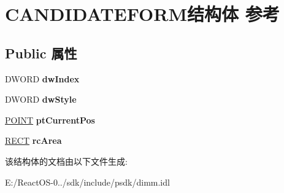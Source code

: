 \hypertarget{struct_c_a_n_d_i_d_a_t_e_f_o_r_m}{}\section{C\+A\+N\+D\+I\+D\+A\+T\+E\+F\+O\+R\+M结构体 参考}
\label{struct_c_a_n_d_i_d_a_t_e_f_o_r_m}
\subsection*{Public 属性}
\begin{DoxyCompactItemize}
\item 
\mbox{\label{struct_c_a_n_d_i_d_a_t_e_f_o_r_m_a150611c94ff5afa1f2fc01c66a6835c1}} 
D\+W\+O\+RD {\bfseries dw\+Index}
\item 
\mbox{\label{struct_c_a_n_d_i_d_a_t_e_f_o_r_m_a500b6deec849300d1800c12c7132fe8d}} 
D\+W\+O\+RD {\bfseries dw\+Style}
\item 
\mbox{\label{struct_c_a_n_d_i_d_a_t_e_f_o_r_m_a507954dc7859cebab4c0308cf3f8ea2a}} 
\hyperlink{structtag_p_o_i_n_t}{P\+O\+I\+NT} {\bfseries pt\+Current\+Pos}
\item 
\mbox{\label{struct_c_a_n_d_i_d_a_t_e_f_o_r_m_a7f091d0ad34fa596622007fb15c3c6b5}} 
\hyperlink{structtag_r_e_c_t}{R\+E\+CT} {\bfseries rc\+Area}
\end{DoxyCompactItemize}


该结构体的文档由以下文件生成\+:\begin{DoxyCompactItemize}
\item 
E\+:/\+React\+O\+S-\/0../sdk/include/psdk/dimm.\+idl\end{DoxyCompactItemize}
